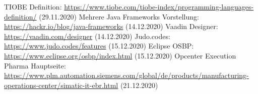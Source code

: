 \documentclass[ngerman]{article}
\begin{document}
\begin{thebibliography}{9}
        TIOBE Definition: \url{https://www.tiobe.com/tiobe-index/programming-languages-definition/} (29.11.2020)
        Mehrere Java Frameworks Vorstellung: \url{https://hackr.io/blog/java-frameworks} (14.12.2020)
        Vaadin Designer: \url{https://vaadin.com/designer} (14.12.2020)
        Judo.codes: \url{https://www.judo.codes/features} (15.12.2020)
        Eclipse OSBP: \url{https://www.eclipse.org/osbp/index.html} (15.12.2020)
        Opcenter Execution Pharma Hauptseite: \url{https://www.plm.automation.siemens.com/global/de/products/manufacturing-operations-center/simatic-it-ebr.html} (21.12.2020)
    \end{thebibliography}
\end{document}
